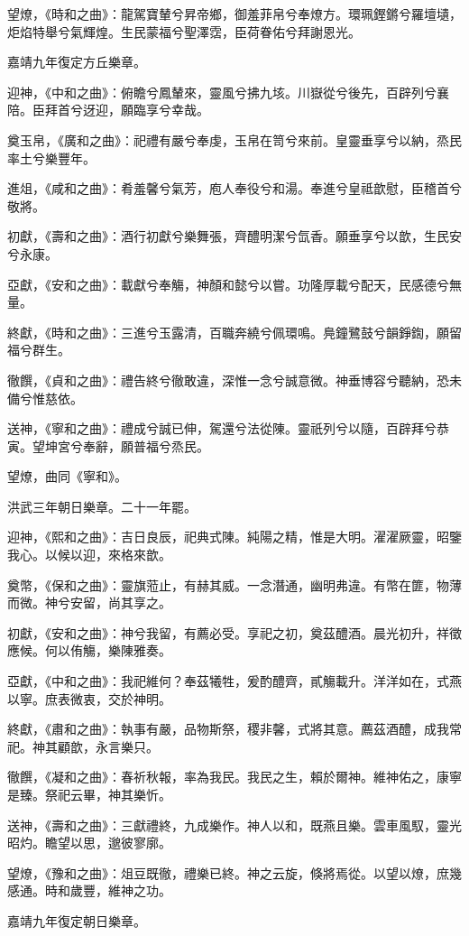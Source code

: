 望燎，《時和之曲》：龍駕寶輦兮昇帝鄉，御羞菲帛兮奉燎方。環珮鏗鏘兮羅壇壝，炬焰特舉兮氣輝煌。生民蒙福兮聖澤霑，臣荷眷佑兮拜謝恩光。

嘉靖九年復定方丘樂章。

迎神，《中和之曲》：俯瞻兮鳳輦來，靈風兮拂九垓。川嶽從兮後先，百辟列兮襄陪。臣拜首兮迓迎，願臨享兮幸哉。

奠玉帛，《廣和之曲》：祀禮有嚴兮奉虔，玉帛在笥兮來前。皇靈垂享兮以納，烝民率土兮樂豐年。

進俎，《咸和之曲》：肴羞馨兮氣芳，庖人奉役兮和湯。奉進兮皇祗歆慰，臣稽首兮敬將。

初獻，《壽和之曲》：酒行初獻兮樂舞張，齊醴明潔兮氙香。願垂享兮以歆，生民安兮永康。

亞獻，《安和之曲》：載獻兮奉觴，神顏和懿兮以嘗。功隆厚載兮配天，民感德兮無量。

終獻，《時和之曲》：三進兮玉露清，百職奔繞兮佩環鳴。鳧鐘鷺鼓兮韻錚鍧，願留福兮群生。

徹饌，《貞和之曲》：禮告終兮徹敢違，深惟一念兮誠意微。神垂博容兮聽納，恐未備兮惟慈依。

送神，《寧和之曲》：禮成兮誠已伸，駕還兮法從陳。靈祇列兮以隨，百辟拜兮恭寅。望坤宮兮奉辭，願普福兮烝民。

望燎，曲同《寧和》。

洪武三年朝日樂章。二十一年罷。

迎神，《熙和之曲》：吉日良辰，祀典式陳。純陽之精，惟是大明。濯濯厥靈，昭鑒我心。以候以迎，來格來歆。

奠幣，《保和之曲》：靈旗蒞止，有赫其威。一念潛通，幽明弗違。有幣在篚，物薄而微。神兮安留，尚其享之。

初獻，《安和之曲》：神兮我留，有薦必受。享祀之初，奠茲醴酒。晨光初升，祥徵應候。何以侑觴，樂陳雅奏。

亞獻，《中和之曲》：我祀維何？奉茲犧牲，爰酌醴齊，貳觴載升。洋洋如在，式燕以寧。庶表微衷，交於神明。

終獻，《肅和之曲》：執事有嚴，品物斯祭，稷非馨，式將其意。薦茲酒醴，成我常祀。神其顧歆，永言樂只。

徹饌，《凝和之曲》：春祈秋報，率為我民。我民之生，賴於爾神。維神佑之，康寧是臻。祭祀云畢，神其樂忻。

送神，《壽和之曲》：三獻禮終，九成樂作。神人以和，既燕且樂。雲車風馭，靈光昭灼。瞻望以思，邈彼寥廓。

望燎，《豫和之曲》：俎豆既徹，禮樂已終。神之云旋，倏將焉從。以望以燎，庶幾感通。時和歲豐，維神之功。

嘉靖九年復定朝日樂章。

